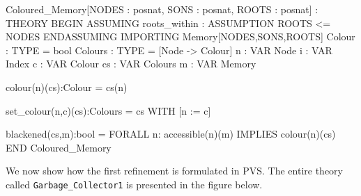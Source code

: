 \begin{smallsession}
Coloured_Memory[NODES : posnat, SONS : posnat, ROOTS : posnat] : THEORY
BEGIN
  ASSUMING roots_within : ASSUMPTION ROOTS <= NODES ENDASSUMING
  IMPORTING Memory[NODES,SONS,ROOTS]
  Colour  : TYPE = bool
  Colours : TYPE = [Node -> Colour]
  n  : VAR Node 
  i  : VAR Index
  c  : VAR Colour
  cs : VAR Colours
  m  : VAR Memory

  colour(n)(cs):Colour = cs(n)

  set_colour(n,c)(cs):Colours = cs WITH [n := c]

  blackened(cs,m):bool = FORALL n: accessible(n)(m) IMPLIES colour(n)(cs)
END Coloured_Memory
\end{smallsession}
\label{pvs-coloured-memory}

We now show how the first refinement is formulated in PVS.  The entire
theory called  {\tt  Garbage\_Collector1} is presented in  the figure
below. 

